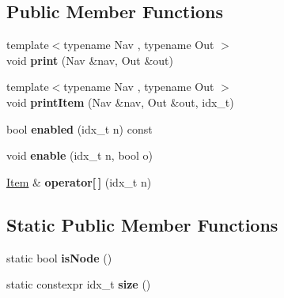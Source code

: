 \subsection*{Public Member Functions}
\begin{DoxyCompactItemize}
\item 
\mbox{\label{structStaticMenu_3_01I_01_4_a4449b1842a30593dc7236d44be58651b}} 
{\footnotesize template$<$typename Nav , typename Out $>$ }\\void {\bfseries print} (Nav \&nav, Out \&out)
\item 
\mbox{\label{structStaticMenu_3_01I_01_4_a67a791084edf441d625a12fe7d649392}} 
{\footnotesize template$<$typename Nav , typename Out $>$ }\\void {\bfseries print\+Item} (Nav \&nav, Out \&out, idx\+\_\+t)
\item 
\mbox{\label{structStaticMenu_3_01I_01_4_ae67af5d6b2cc7630b7ab12e2e1bc4dd1}} 
bool {\bfseries enabled} (idx\+\_\+t n) const
\item 
\mbox{\label{structStaticMenu_3_01I_01_4_afa003d349bc90ab91e5f94d44593879c}} 
void {\bfseries enable} (idx\+\_\+t n, bool o)
\item 
\mbox{\label{structStaticMenu_3_01I_01_4_a7401ff7a97b2e9c8d196a5dd1f67600e}} 
\hyperlink{structItem}{Item} \& {\bfseries operator\mbox{[}$\,$\mbox{]}} (idx\+\_\+t n)
\end{DoxyCompactItemize}
\subsection*{Static Public Member Functions}
\begin{DoxyCompactItemize}
\item 
\mbox{\label{structStaticMenu_3_01I_01_4_a1d6bd1235f1a34be7052a775c01dfe7d}} 
static bool {\bfseries is\+Node} ()
\item 
\mbox{\label{structStaticMenu_3_01I_01_4_a070f528540a846fa3280e7827b9de47a}} 
static constexpr idx\+\_\+t {\bfseries size} ()
\end{DoxyCompactItemize}


